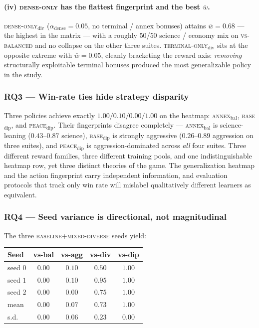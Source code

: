 \paragraph{(iv) \textsc{dense-only} has the flattest fingerprint and the best $\bar{w}$.}
\textsc{dense-only}$_{\text{div}}$ ($\alpha_{\text{dense}}{=}0.05$, no
terminal / annex bonuses) attains $\bar{w}{=}0.68$ --- the highest in the
matrix --- with a roughly $50$/$50$ science / economy mix on
\textsc{vs-balanced} and no collapse on the other three suites.
\textsc{terminal-only}$_{\text{div}}$ sits at the opposite extreme with
$\bar{w}{=}0.05$, cleanly bracketing the reward axis: \emph{removing}
structurally exploitable terminal bonuses produced the most generalizable
policy in the study.

\subsubsection{RQ3 --- Win-rate ties hide strategy disparity}
\label{sec:rq3}

Three policies achieve exactly $1.00/0.10/0.00/1.00$ on the heatmap:
\textsc{annex}$_{\text{bal}}$, \textsc{base}$_{\text{dip}}$, and
\textsc{peace}$_{\text{dip}}$. Their fingerprints disagree completely ---
\textsc{annex}$_{\text{bal}}$ is science-leaning ($0.43$--$0.87$ science),
\textsc{base}$_{\text{dip}}$ is strongly aggressive ($0.26$--$0.89$
aggression on three suites), and \textsc{peace}$_{\text{dip}}$ is
aggression-dominated across \emph{all} four suites. Three different reward
families, three different training pools, and one indistinguishable heatmap
row, yet three distinct theories of the game. The generalization heatmap and
the action fingerprint carry independent information, and evaluation
protocols that track only win rate will mislabel qualitatively different
learners as equivalent.

\subsubsection{RQ4 --- Seed variance is directional, not magnitudinal}
\label{sec:rq4}

The three \textsc{baseline}+\textsc{mixed-diverse} seeds yield:

\begin{center}
\small
\begin{tabular}{lcccc}
\toprule
Seed & vs-bal & vs-agg & vs-div & vs-dip \\
\midrule
seed $0$ & $0.00$ & $0.10$ & $0.50$ & $1.00$ \\
seed $1$ & $0.00$ & $0.10$ & $0.95$ & $1.00$ \\
seed $2$ & $0.00$ & $0.00$ & $0.75$ & $1.00$ \\
\midrule
mean     & $0.00$ & $0.07$ & $\mathbf{0.73}$ & $1.00$ \\
s.d.     & $0.00$ & $0.06$ & $\mathbf{0.23}$ & $0.00$ \\
\bottomrule
\end{tabular}
\end{center}

